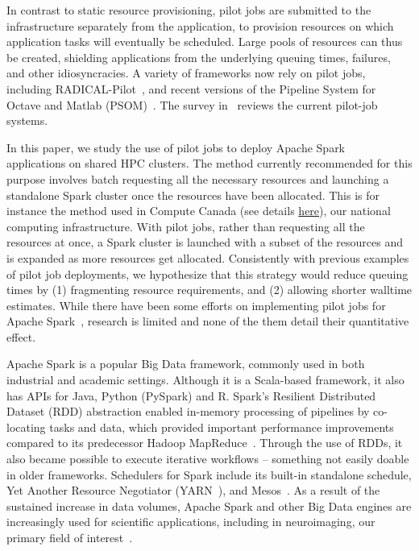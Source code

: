 \documentclass{IEEEtran}
\begin{document}
In contrast to static resource provisioning, pilot jobs are submitted to
the infrastructure separately from the application, to provision resources
on which application tasks will eventually be scheduled. Large pools of
resources can thus be created, shielding applications from the underlying
queuing times, failures, and other idiosyncracies. A variety of frameworks
now rely on pilot jobs, including RADICAL-Pilot~\cite{merzky2015radical},
and recent versions of the Pipeline System for Octave and Matlab
(PSOM)~\cite{bellec2012pipeline}. The survey in~\cite{turilli2018comprehensive} reviews
the current pilot-job systems.

In this paper, we study the use of pilot jobs to deploy Apache
Spark~\cite{zaharia2016apache} applications on shared HPC clusters. The method
currently recommended for this purpose involves batch requesting all the
necessary resources and launching a standalone Spark cluster once the
resources have been allocated. This is for instance the method used in
Compute Canada (see details \href{https://docs.computecanada.ca/wiki/Apache_Spark/en}{here}),
 our national computing infrastructure. With pilot
jobs, rather than requesting all the resources at once, a Spark cluster is
launched with a subset of the resources and is expanded as more resources
get allocated. Consistently with previous examples of pilot job
deployments, we hypothesize that this strategy would reduce queuing times
by (1) fragmenting resource requirements, and (2) allowing shorter walltime
estimates. While there have been some efforts on implementing pilot jobs
for Apache Spark~\cite{jha-spark-pbs}, research is limited and
none of the them detail their quantitative effect.

Apache Spark is a popular Big Data framework, commonly used in both
industrial and academic settings. Although it is a Scala-based framework,
it also has APIs for Java, Python (PySpark) and R. Spark's Resilient
Distributed Dataset (RDD) abstraction enabled in-memory processing of
pipelines by co-locating tasks and data, which provided important
performance improvements compared to its predecessor Hadoop
MapReduce~\cite{dean2008mapreduce}. Through the use of RDDs, it also became possible
to execute iterative workflows -- something not easily doable in older
frameworks. Schedulers for Spark include its built-in standalone schedule,
Yet Another Resource Negotiator (YARN~\cite{apache13yet}), and Mesos~\cite{hindman2011mesos}. As a
result of the sustained increase in data volumes, Apache Spark and other
Big Data engines are increasingly used for scientific applications,
including in neuroimaging, our primary field of
interest~\cite{boubela2016big,mehta2017comparative,maybethesimulationone,freeman2014mapping}.
\end{document}
